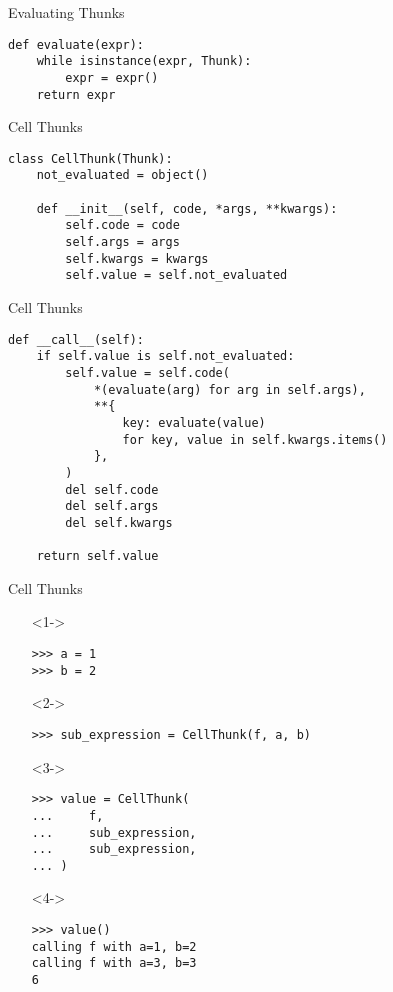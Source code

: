 \documentclass{beamer}
\begin{document}
\begin{frame}[fragile]{Evaluating Thunks}
  \begin{verbatim}
def evaluate(expr):
    while isinstance(expr, Thunk):
        expr = expr()
    return expr
  \end{verbatim}
\end{frame}

\begin{frame}[fragile]{Cell Thunks}
  \begin{verbatim}
class CellThunk(Thunk):
    not_evaluated = object()

    def __init__(self, code, *args, **kwargs):
        self.code = code
        self.args = args
        self.kwargs = kwargs
        self.value = self.not_evaluated
  \end{verbatim}
\end{frame}

\begin{frame}[fragile]{Cell Thunks}
  \begin{verbatim}
def __call__(self):
    if self.value is self.not_evaluated:
        self.value = self.code(
            *(evaluate(arg) for arg in self.args),
            **{
                key: evaluate(value)
                for key, value in self.kwargs.items()
            },
        )
        del self.code
        del self.args
        del self.kwargs

    return self.value
  \end{verbatim}
\end{frame}

\begin{frame}[fragile]{Cell Thunks}
  \begin{itemize}
  \item[]<1-> \begin{verbatim}
>>> a = 1
>>> b = 2
    \end{verbatim}
  \item[]<2-> \begin{verbatim}
>>> sub_expression = CellThunk(f, a, b)
    \end{verbatim}
  \item[]<3-> \begin{verbatim}
>>> value = CellThunk(
...     f,
...     sub_expression,
...     sub_expression,
... )
    \end{verbatim}
  \item[]<4-> \begin{verbatim}
>>> value()
calling f with a=1, b=2
calling f with a=3, b=3
6
    \end{verbatim}
  \end{itemize}
\end{frame}
\end{document}

